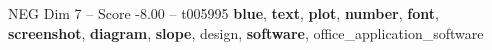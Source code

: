 \begin{textsample}{NEG Dim 7 – Score -8.00 – t005995}  \label{ex:f7_neg_007}
\textbf{blue}, \textbf{text}, \textbf{plot}, \textbf{number}, \textbf{font}, \textbf{screenshot}, \textbf{diagram}, \textbf{slope}, design, \textbf{software}, office\_application\_software

\end{textsample}
